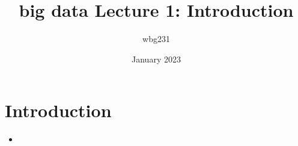 \documentclass{article}
\title{big data Lecture 1: Introduction}
\author{wbg231 }
\date{January 2023}
\begin{document}
\maketitle

\section{Introduction}
\begin{itemize}
    \item 
\end{itemize}
\end{document}
